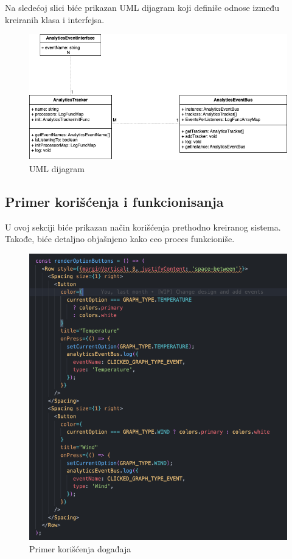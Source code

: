 \documentclass[12pt,oneside]{memoir}
\begin{document}
Na sledećoj slici biće prikazan UML dijagram koji definiše odnose između kreiranih klasa i interfejsa.

\begin{figure}[h!]
\centering
\includegraphics[scale=0.5]{docs/images/chapterSix/uml.png}
\caption{UML dijagram}
\label{fig:umlDiagram}
\end{figure}

\subsection{Primer korišćenja i funkcionisanja}

U ovoj sekciji biće prikazan način korišćenja prethodno kreiranog sistema. Takođe, biće detaljno objašnjeno kako ceo proces funkcioniše.

\begin{figure}[h!]
\centering
\includegraphics[scale=0.30]{docs/images/chapterSix/eventUsage.png}
\caption{Primer korišćenja događaja}
\label{fig:eventUsage}
\end{figure}
\end{document}
